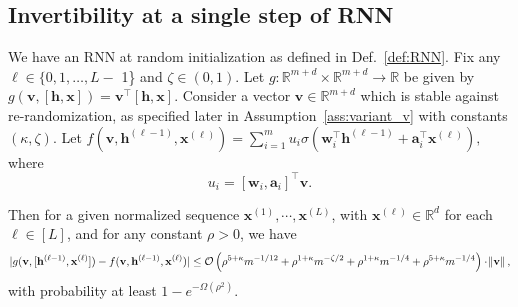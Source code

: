 \subsection{Invertibility at a single step of RNN}
\begin{lemma}\label{lemma:singlecell_ESN}
	We have an RNN at random initialization as defined in Def.~\ref{def:RNN}. Fix any $\ell \in\{0,1, \ldots, L-$ 1\} and $\zeta \in(0,1)$. Let $g: \mathbb{R}^{m+d } \times \mathbb{R}^{m+d}  \rightarrow \mathbb{R}$ be given by $g(\mathbf{v}, [\mathbf{h}, \mathbf{x}]) = \mathbf{v}^{\top} [\mathbf{h}, \mathbf{x}]$. Consider a vector $\mathbf{v} \in \mathbb{R}^{m+d}$ which is stable against re-randomization, as specified later in Assumption~\ref{ass:variant_v} with constants $(\kappa, \zeta)$.
	Let $f\left(\mathbf{v}, \mathbf{h}^{(\ell-1)}, \mathbf{x}^{(\ell)}\right) = \sum_{i=1}^{m} u_i \sigma\left(\mathbf{w}_i^{\top} \mathbf{h}^{(\ell-1)} +  \mathbf{a}_i^{\top} \mathbf{x}^{(\ell)} \right),$ where 
	$$ u_i = [\mathbf{w}_i, \mathbf{a}_i]^{\top} \mathbf{v}.$$
	
	Then for a given normalized sequence $\mathbf{x}^{(1)}, \cdots, \mathbf{x}^{(L)}$, with $\mathbf{x}^{(\ell)} \in \mathbb{R}^{d}$ for each $\ell \in [L]$, and for any constant $\rho > 0$, we have 
	\begin{equation*} \abs[0]{g({\mathbf{v}}, [\mathbf{h}^{(\ell-1)}, \mathbf{x}^{(\ell)}]) - f(\mathbf{v}, \mathbf{h}^{(\ell-1)}, \mathbf{x}^{(\ell)})} \le \mathcal{O}\left(\rho^{5 + \kappa} m^{-1/12} + \rho^{1+\kappa} m^{-\zeta/2} + \rho^{1+\kappa} m^{-1/4} + \rho^{5+\kappa} m^{-1/4}  \right) \cdot \norm{\mathbf{v}},
	\end{equation*}
	with probability at least $1 -  e^{-\Omega(\rho^2)}$.%
	
\end{lemma}

